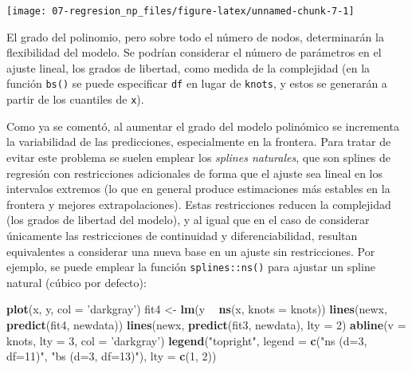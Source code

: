 \documentclass[
  spanish,
]{book}
\newenvironment{Shaded}{\begin{snugshade}}{\end{snugshade}}
\newcommand{\DataTypeTok}[1]{\textcolor[rgb]{0.13,0.29,0.53}{#1}}
\newcommand{\DecValTok}[1]{\textcolor[rgb]{0.00,0.00,0.81}{#1}}
\newcommand{\KeywordTok}[1]{\textcolor[rgb]{0.13,0.29,0.53}{\textbf{#1}}}
\newcommand{\NormalTok}[1]{#1}
\newcommand{\OperatorTok}[1]{\textcolor[rgb]{0.81,0.36,0.00}{\textbf{#1}}}
\newcommand{\StringTok}[1]{\textcolor[rgb]{0.31,0.60,0.02}{#1}}
\theoremstyle{break}
\theoremstyle{definition}
\theoremstyle{definition}
\theoremstyle{definition}
\theoremstyle{remark}
\begin{document}
\begin{center}\texttt{[image: 07-regresion\_np\_files/figure-latex/unnamed-chunk-7-1]} \end{center}

El grado del polinomio, pero sobre todo el número de nodos, determinarán la flexibilidad del modelo.
Se podrían considerar el número de parámetros en el ajuste lineal, los grados de libertad, como medida de la complejidad (en la función \texttt{bs()} se puede especificar \texttt{df} en lugar de \texttt{knots}, y estos se generarán a partir de los cuantiles de \texttt{x}).

Como ya se comentó, al aumentar el grado del modelo polinómico se incrementa la variabilidad de las predicciones, especialmente en la frontera.
Para tratar de evitar este problema se suelen emplear los \emph{splines naturales}, que son splines de regresión con restricciones adicionales de forma que el ajuste sea lineal en los intervalos extremos (lo que en general produce estimaciones más estables en la frontera y mejores extrapolaciones).
Estas restricciones reducen la complejidad (los grados de libertad del modelo), y al igual que en el caso de considerar únicamente las restricciones de continuidad y diferenciabilidad, resultan equivalentes a considerar una nueva base en un ajuste sin restricciones.
Por ejemplo, se puede emplear la función \texttt{splines::ns()} para ajustar un spline natural (cúbico por defecto):

\begin{Shaded}
\begin{Highlighting}[]
\KeywordTok{plot}\NormalTok{(x, y, }\DataTypeTok{col =} \StringTok{'darkgray'}\NormalTok{)}
\NormalTok{fit4 <-}\StringTok{ }\KeywordTok{lm}\NormalTok{(y }\OperatorTok{~}\StringTok{ }\KeywordTok{ns}\NormalTok{(x, }\DataTypeTok{knots =}\NormalTok{ knots))}
\KeywordTok{lines}\NormalTok{(newx, }\KeywordTok{predict}\NormalTok{(fit4, newdata))}
\KeywordTok{lines}\NormalTok{(newx, }\KeywordTok{predict}\NormalTok{(fit3, newdata), }\DataTypeTok{lty =} \DecValTok{2}\NormalTok{)}
\KeywordTok{abline}\NormalTok{(}\DataTypeTok{v =}\NormalTok{ knots, }\DataTypeTok{lty =} \DecValTok{3}\NormalTok{, }\DataTypeTok{col =} \StringTok{'darkgray'}\NormalTok{)}
\KeywordTok{legend}\NormalTok{(}\StringTok{"topright"}\NormalTok{, }\DataTypeTok{legend =} \KeywordTok{c}\NormalTok{(}\StringTok{"ns (d=3, df=11)"}\NormalTok{, }\StringTok{"bs (d=3, df=13)"}\NormalTok{), }\DataTypeTok{lty =} \KeywordTok{c}\NormalTok{(}\DecValTok{1}\NormalTok{, }\DecValTok{2}\NormalTok{))}
\end{Highlighting}
\end{Shaded}
\end{document}
